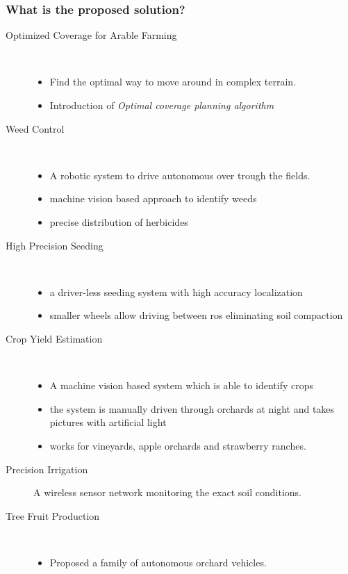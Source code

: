 \documentclass{article}
\begin{document}
\subsubsection*{What is the proposed solution?}
\begin{description}

    \item[Optimized Coverage for Arable Farming] \
    \begin{itemize}
        \item Find the optimal way to move around in complex terrain.
        \item Introduction of \emph{Optimal coverage planning algorithm}
    \end{itemize}
    \item[Weed Control]\
    \begin{itemize}
        \item A robotic system to drive autonomous over trough the fields.
        \item machine vision based approach to identify weeds
        \item precise distribution of herbicides
    \end{itemize}
    \item[High Precision Seeding]\
    \begin{itemize}
        \item a driver-less seeding system with high accuracy localization
        \item smaller wheels allow driving between ros eliminating soil compaction 
    \end{itemize}
    \item[Crop Yield Estimation]\
    \begin{itemize}
        \item A machine vision based system which is able to identify crops
        \item the system is manually driven through orchards at night and takes pictures with artificial light
        \item works for vineyards, apple orchards and strawberry ranches.
    \end{itemize} 
    \item[Precision Irrigation] A wireless sensor network monitoring the exact soil conditions.
    \item[Tree Fruit Production] \
    \begin{itemize}
        \item Proposed a family of autonomous orchard vehicles. 

\end{itemize}
\end{description}
\end{document}
